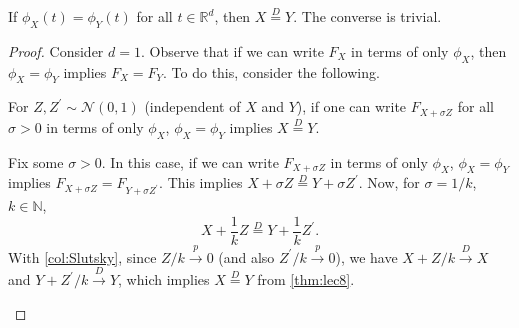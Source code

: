 \begin{theorem}[Uniqueness]\label{thm:uniqueness}
	If \(\phi _X(t) = \phi _Y(t)\) for all \(t\in \mathbb{R} ^d\), then \(X\overset{D}{=} Y\). The converse is trivial.
\end{theorem}
\begin{proof}
	Consider \(d = 1\). Observe that if we can write \(F_X\) in terms of only \(\phi _X\), then \(\phi _X = \phi _Y\) implies \(F_X = F_Y\). To do this, consider the following.

	\begin{claim}
		For \(Z, Z^{\prime} \sim \mathcal{N} (0, 1)\) (independent of \(X\) and \(Y\)), if one can write \(F_{X + \sigma Z}\) for all \(\sigma > 0\) in terms of only \(\phi _X\), \(\phi _X = \phi _Y\) implies \(X \overset{D}{=} Y\).
	\end{claim}
	\begin{explanation}
		Fix some \(\sigma > 0\). In this case, if we can write \(F_{X + \sigma Z}\) in terms of only \(\phi _X\), \(\phi _X = \phi _Y\) implies \(F_{X + \sigma Z} = F_{Y + \sigma Z^{\prime} }\). This implies \(X + \sigma Z \overset{D}{=} Y + \sigma Z^{\prime} \). Now, for \(\sigma = 1 / k\), \(k \in \mathbb{N} \),
		\[
			X + \frac{1}{k} Z \overset{D}{=} Y + \frac{1}{k} Z^{\prime} .
		\]
		With \autoref{col:Slutsky}, since \(Z / k \overset{p}{\to } 0\) (and also \(Z^{\prime} / k \overset{p}{\to } 0\)), we have \(X + Z / k \overset{D}{\to } X\) and \(Y + Z^{\prime} / k \overset{D}{\to } Y\), which implies \(X \overset{D}{=} Y\) from \autoref{thm:lec8}.
	\end{explanation}


\end{proof}
